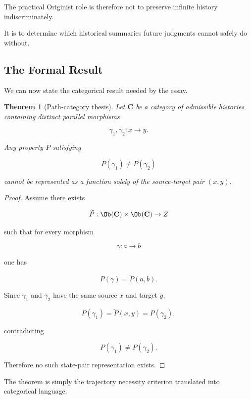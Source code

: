 \documentclass[
  11pt,
  a4paper,
  DIV=12,
  BCOR=0mm,
  parskip=half-
]{scrartcl}
\theoremstyle{definition}
\theoremstyle{plain}
\newtheorem{theorem}[definition]{Theorem}
\theoremstyle{remark}
\begin{document}
The practical Originist role is therefore not to preserve infinite history
indiscriminately.

It is to determine which historical summaries future judgments cannot safely
do without.


\subsection{The Formal Result}
\label{app:path-category-thesis}

We can now state the categorical result needed by the essay.

\begin{theorem}[Path-category thesis]
\label{thm:path-category-thesis}
Let \(\mathbf C\) be a category of admissible histories containing distinct
parallel morphisms

\[
  \gamma_1,\gamma_2:x\to y.
\]

Any property \(P\) satisfying

\[
  P(\gamma_1)\neq P(\gamma_2)
\]

cannot be represented as a function solely of the source-target pair
\((x,y)\).
\end{theorem}

\begin{proof}
Assume there exists

\[
  \widetilde P:
  \Ob(\mathbf C)\times\Ob(\mathbf C)
  \to Z
\]

such that for every morphism

\[
  \gamma:a\to b
\]

one has

\[
  P(\gamma)=\widetilde P(a,b).
\]

Since \(\gamma_1\) and \(\gamma_2\) have the same source \(x\) and target \(y\),

\[
  P(\gamma_1)
  =
  \widetilde P(x,y)
  =
  P(\gamma_2),
\]

contradicting

\[
  P(\gamma_1)\neq P(\gamma_2).
\]

Therefore no such state-pair representation exists.
\end{proof}

The theorem is simply the trajectory necessity criterion translated into
categorical language.
\end{document}
